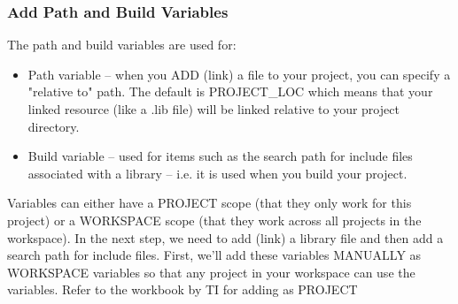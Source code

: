 \documentclass[a4paper,10pt,oneside]{article}
\begin{document}
			\subsubsection{\textbf{Add Path and Build Variables}}
					{The path and build variables are used for:
					\begin{itemize}
						\item  Path variable – when you ADD (link) a file to your project, you can specify a "relative to" path. The default is PROJECT\_LOC which means that your linked resource (like a .lib	file) will be linked relative to your project directory.
						\item  Build variable – used for items such as the search path for include files associated with a library – i.e. it is used when you build your project.
				\end{itemize}
					Variables can either have a PROJECT scope (that they only work for this project) or a
					WORKSPACE scope (that they work across all projects in the workspace).
					In the next step, we need to add (link) a library file and then add a search path for include files.
					First, we’ll add these variables MANUALLY as WORKSPACE variables so that any project in your
					workspace can use the variables. Refer to the workbook by TI for adding as PROJECT}
\end{document}
